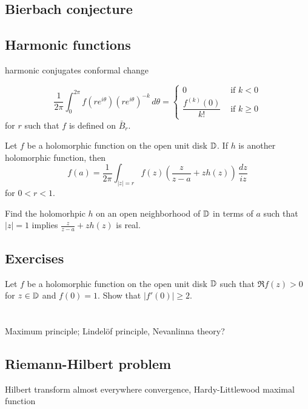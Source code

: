 \documentclass{../../large}
\begin{document}
\section{Bierbach conjecture}
\section{Harmonic functions}
harmonic conjugates
conformal change

\begin{prb}
\[\frac1{2\pi}\int_0^{2\pi}f(re^{i\theta})(re^{i\theta})^{-k}\,d\theta
=\begin{cases}0&\text{ if }k<0\\\dfrac{f^{(k)}(0)}{k!}&\text{ if }k\ge0\end{cases}\]
for $r$ such that $f$ is defined on $\bar B_r$.
\end{prb}
\begin{prb}
Let $f$ be a holomorphic function on the open unit disk $\mathbb{D}$.
If $h$ is another holomorphic function, then
\[f(a)=\frac1{2\pi}\int_{|z|=r}f(z)\left(\frac z{z-a}+zh(z)\right)\,\frac{dz}{iz}\]
for $0<r<1$.
\begin{parts}
\item Find the holomorhpic $h$ on an open neighborhood of $\mathbb{D}$ in terms of $a$ such that $|z|=1$ implies $\frac z{z-a}+zh(z)$ is real.
\end{parts}
\end{prb}


\section{Exercises}
\begin{prb}
Let $f$ be a holomorphic function on the open unit disk $\mathbb{D}$ such that $\Re f(z)>0$ for $z\in\mathbb{D}$ and $f(0)=1$. Show that $|f'(0)|\ge2$.
\end{prb}


\chapter{}

Maximum principle; Lindelöf principle,
Nevanlinna theory?

\section{Riemann-Hilbert problem}
Hilbert transform
almost everywhere convergence, Hardy-Littlewood maximal function
\end{document}
